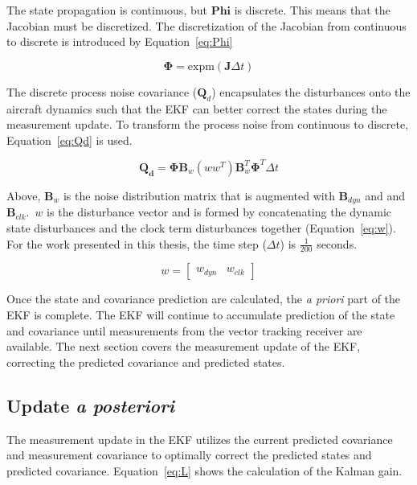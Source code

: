 The state propagation is continuous, but \(\mathbf{Phi}\) is discrete. This means that the Jacobian must be discretized. The discretization of the Jacobian from continuous to discrete is introduced by Equation~\ref{eq:Phi}

\begin{equation}\label{eq:Phi}
    \mathbf{\Phi} = \textrm{expm}(\mathbf{J}\Delta t)
\end{equation}

The discrete process noise covariance (\(\mathbf{Q}_d\)) encapsulates the disturbances onto the aircraft dynamics such that the EKF can better correct the states during the measurement update. To transform the process noise from continuous to discrete, Equation~\ref{eq:Qd} is used.

\begin{equation}\label{eq:Qd}
    \mathbf{Q_d} = \mathbf{\Phi}\mathbf{B}_w \left(ww^T\right) \mathbf{B}_w^T \mathbf{\Phi}^T \Delta t
\end{equation}

Above, \(\mathbf{B}_w\) is the noise distribution matrix that is augmented with \(\mathbf{B}_{dyn}\) and and \(\mathbf{B}_{clk}\).~\(w\) is the disturbance vector and is formed by concatenating the dynamic state disturbances and the clock term disturbances together (Equation~\ref{eq:w}). For the work presented in this thesis, the time step (\(\Delta t\)) is \( \frac{1}{200}\) seconds.

\begin{equation}\label{eq:w}
    w = \begin{bmatrix}
        w_{dyn} & w_{clk}
    \end{bmatrix}
\end{equation}

Once the state and covariance prediction are calculated, the \textit{a priori} part of the EKF is complete. The EKF will continue to accumulate prediction of the state and covariance until measurements from the vector tracking receiver are available. The next section covers the measurement update of the EKF, correcting the predicted covariance and predicted states.

\subsection{Update \textit{a posteriori}}
The measurement update in the EKF utilizes the current predicted covariance and measurement covariance to optimally correct the predicted states and predicted covariance. Equation~\ref{eq:L} shows the calculation of the Kalman gain.

